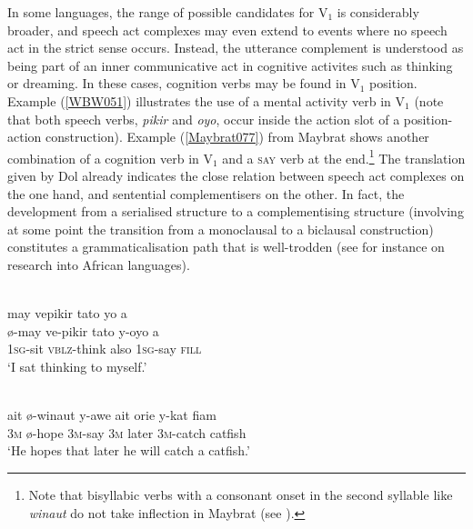 In some languages, the range of possible candidates for V$_{1}$ is considerably broader, and speech act complexes may even extend to events where no speech act in the strict sense occurs. Instead, the utterance complement is understood as being part of an inner communicative act in cognitive activites such as thinking or dreaming. In these cases, cognition verbs may be found in V$_{1}$ position. Example (\ref{WBW051}) illustrates the use of a mental activity verb in V$_{1}$ (note that both speech verbs, \textit{pikir} and \textit{oyo}, occur inside the action slot of a position-action construction). Example (\ref{Maybrat077}) from Maybrat shows another combination of a cognition verb in V$_{1}$ and a \textsc{say} verb at the end.\footnote{Note that bisyllabic verbs with a consonant onset in the second syllable like \textit{winaut} do not take inflection in Maybrat (see \citealt[52]{dol2007grammar}).} The translation given by Dol already indicates the close relation between speech act complexes on the one hand, and sentential complementisers on the other. In fact, the development from a serialised structure to a complementising structure (involving at some point the transition from a monoclausal to a biclausal construction) constitutes a grammaticalisation path that is well-trodden (see for instance \citealt{lord1993historical} on research into African languages).

\ea \label{WBW051}
\\
\glll may vepikir tato yo a \\
ø-may ve-pikir tato y-oyo a \\
\textsc{1}\textsc{sg}-sit \textsc{vblz}-think also \textsc{1}\textsc{sg}-say \textsc{fill} \\
\glft `I sat thinking to myself.'\\ 
\z

\ea \label{Maybrat077}
\\
\gll ait ø-winaut y-awe ait orie y-kat fiam \\
\textsc{3}\textsc{m} ø-hope \textsc{3}\textsc{m}-say \textsc{3}\textsc{m} later \textsc{3}\textsc{m}-catch catfish \\
\glft `He hopes that later he will catch a catfish.'\\ 
\z

